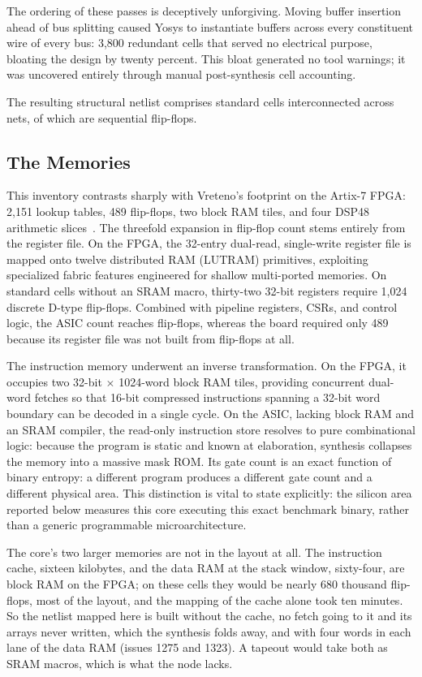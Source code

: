 \documentclass[journal,9pt]{IEEEtran}
\begin{document}
The ordering of these passes is deceptively unforgiving. Moving buffer
insertion ahead of bus splitting caused Yosys to instantiate buffers
across every constituent wire of every bus: 3,800 redundant cells that
served no electrical purpose, bloating the design by twenty percent.
This bloat generated no tool warnings; it was uncovered entirely
through manual post-synthesis cell accounting.

The resulting structural netlist comprises \asiccells{} standard cells
interconnected across \asicnets{} nets, of which \asicflops{} are
sequential flip-flops.

\subsection{The Memories}

This inventory contrasts sharply with Vreteno's footprint on the
Artix-7 FPGA: 2,151 lookup tables, 489 flip-flops, two block RAM tiles,
and four DSP48 arithmetic slices~\cite{vreteno}. The threefold expansion
in flip-flop count stems entirely from the register file. On the FPGA,
the 32-entry dual-read, single-write register file is mapped onto twelve
distributed RAM (LUTRAM) primitives, exploiting specialized fabric
features engineered for shallow multi-ported memories. On standard cells
without an SRAM macro, thirty-two 32-bit registers require 1,024
discrete D-type flip-flops. Combined with pipeline registers, CSRs, and
control logic, the ASIC count reaches \asicflops{} flip-flops, whereas
the board required only 489 because its register file was not built from
flip-flops at all.

The instruction memory underwent an inverse transformation. On the FPGA,
it occupies two 32-bit $\times$ 1024-word block RAM tiles, providing
concurrent dual-word fetches so that 16-bit compressed instructions
spanning a 32-bit word boundary can be decoded in a single cycle. On the
ASIC, lacking block RAM and an SRAM compiler, the read-only instruction
store resolves to pure combinational logic: because the program is static
and known at elaboration, synthesis collapses the memory into a massive
mask ROM. Its gate count is an exact function of binary entropy: a
different program produces a different gate count and a different
physical area. This distinction is vital to state explicitly: the
silicon area reported below measures this core executing this exact
benchmark binary, rather than a generic programmable microarchitecture.

The core's two larger memories are not in the layout at all. The
instruction cache, sixteen kilobytes, and the data RAM at the stack
window, sixty-four, are block RAM on the FPGA; on these cells they
would be nearly 680 thousand flip-flops, most of the layout, and the
mapping of the cache alone took ten minutes. So the netlist mapped
here is built without the cache, no fetch going to it and its arrays
never written, which the synthesis folds away, and with four words in
each lane of the data RAM (issues 1275 and 1323). A tapeout would take
both as SRAM macros, which is what the node lacks.
\end{document}
